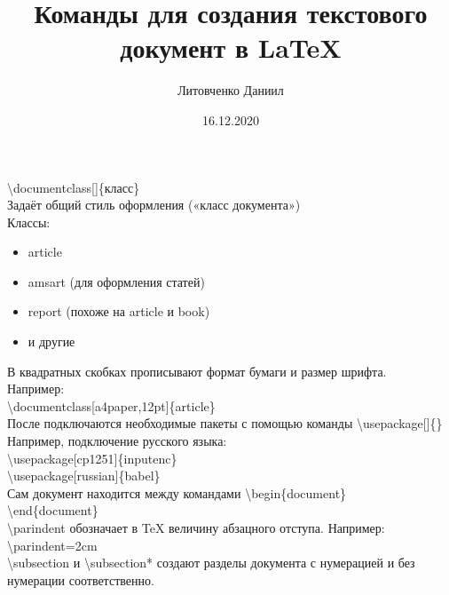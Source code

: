 \documentclass[a4paper,12pt]{article} %
\author{Литовченко Даниил}
\title{Команды для создания текстового документ в \LaTeX{}}
\date{16.12.2020}
\begin{document}

\maketitle
\newpage

\textbackslash documentclass[]\{класс\}\\
Задаёт общий стиль оформления («класс документа»)\\
Классы:\\
\begin{itemize}
\item article
\item amsart (для оформления статей)
\item report (похоже на article и book) 
\item и другие
\end{itemize}
В квадратных скобках прописывают формат бумаги и размер шрифта.\\
Например:\\
\textbackslash documentclass[a4paper,12pt]\{article\}\\
После подключаются необходимые пакеты с помощью команды \textbackslash usepackage[]\{\}\\
Например, подключение русского языка:\\
\textbackslash usepackage[cp1251]\{inputenc\}\\
\textbackslash usepackage[russian]\{babel\}\\

Сам документ находится между командами
\textbackslash begin\{document\}\\
\textbackslash end\{document\}\\
\textbackslash parindent        обозначает в \TeX{} величину абзацного отступа.
Например:\\
\textbackslash parindent=2cm\\

\textbackslash subsection и \textbackslash subsection* создают разделы документа с нумерацией и без нумерации соответственно.
\end{document}
